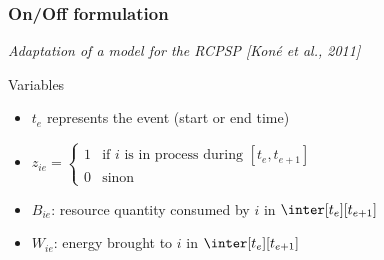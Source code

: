 \begin{frame}
  \frametitle{On/Off formulation}
  {\small \it Adaptation of a model for the RCPSP {\color{gray!50!black!50} \it [Koné et al., 2011]}}
  \vfill
  \pause
  \begin{block}{Variables}
    \begin{itemize}
    \item  $t_e$ represents the event (start or end time)
      \pause
      \vspace{0.3cm}
    \item $z_{ie}=\left\{
        \begin{array}{ll}
          1 & \text{if $i$ is in process during $[t_{e},t_{e+1}]$}\\
          0 & \text{sinon}
        \end{array}
      \right.
      $
      \pause
      \vspace{0.3cm}
    \item $B_{ie}$: resource quantity consumed by $i$ in $\inter[t_e][t_{e+1}]$
      \vspace{0.3cm}
    \item $W_{ie}$: energy brought to $i$ in $\inter[t_e][t_{e+1}]$   
    \end{itemize}
  \end{block}
\end{frame}







